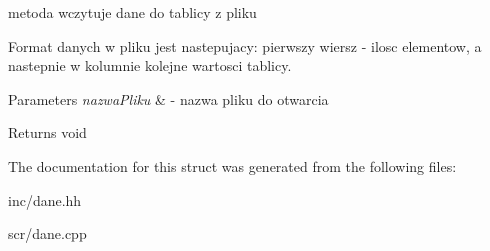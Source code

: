 metoda wczytuje dane do tablicy z pliku 

Format danych w pliku jest nastepujacy\-: pierwszy wiersz -\/ ilosc elementow, a nastepnie w kolumnie kolejne wartosci tablicy. 
\begin{DoxyParams}{Parameters}
{\em nazwa\-Pliku} & -\/ nazwa pliku do otwarcia \\
\hline
\end{DoxyParams}
\begin{DoxyReturn}{Returns}
void 
\end{DoxyReturn}


The documentation for this struct was generated from the following files\-:\begin{DoxyCompactItemize}
\item 
inc/dane.\-hh\item 
scr/dane.\-cpp\end{DoxyCompactItemize}
